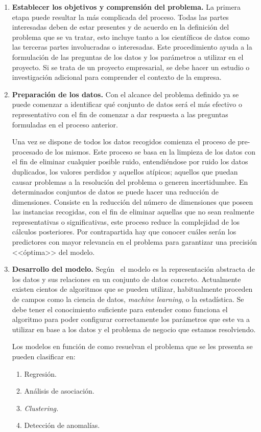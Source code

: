 \begin{enumerate}
   \item \textbf{Establecer los objetivos y comprensión del problema.}
    La primera etapa puede resultar la más complicada del proceso. Todas las partes interesadas deben de estar presentes y de acuerdo en la definición del problema que se va tratar, esto incluye tanto a los científicos de datos como las terceras partes involucradas o interesadas. 
    Este procedimiento ayuda a la formulación de las preguntas de los datos y los parámetros a utilizar en el proyecto. Si se trata de un proyecto empresarial, se debe hacer un estudio o investigación adicional para comprender el contexto de la empresa.
    \item \textbf{Preparación de los datos.}
    Con el alcance del problema definido ya se puede comenzar a identificar qué conjunto de datos será el más efectivo o representativo con el fin de comenzar a dar respuesta a las preguntas formuladas en el proceso anterior.
    
    Una vez se dispone de todos los datos recogidos comienza el proceso de pre-procesado de los mismos. Este proceso se basa en la limpieza de los datos con el fin de eliminar cualquier posible ruido, entendiéndose por ruido los datos duplicados, los valores perdidos y aquellos atípicos; aquellos que puedan causar problemas a la resolución del problema o generen incertidumbre.
    En determinados conjuntos de datos se puede hacer una reducción de dimensiones. Consiste en la reducción del número de dimensiones que poseen las instancias recogidas, con el fin de eliminar aquellas que no sean realmente representativas o significativas, este proceso reduce la complejidad de los cálculos posteriores. Por contrapartida hay que conocer cuáles serán los predictores con mayor relevancia en el problema para garantizar una precisión <<óptima>> del modelo.
    \item \textbf{Desarrollo del modelo.}
    Según~\cite{KOTU201517} el modelo es la representación abstracta de los datos y sus relaciones en un conjunto de datos concreto. Actualmente existen cientos de algoritmos que se pueden utilizar, habitualmente proceden de campos como la ciencia de datos, \textit{machine learning}, o la estadística.
    Se debe tener el conocimiento suficiente para entender como funciona el algoritmo para poder configurar correctamente los parámetros que este va a utilizar en base a los datos y el problema de negocio que estamos resolviendo. 
    
    Los modelos en función de como resuelvan el problema que se les presenta se pueden clasificar en:
    \begin{enumerate}
        \item Regresión.
        \item Análisis de asociación.
        \item \textit{Clustering.}
        \item Detección de anomalías.
    \end{enumerate}
    

\end{enumerate}
